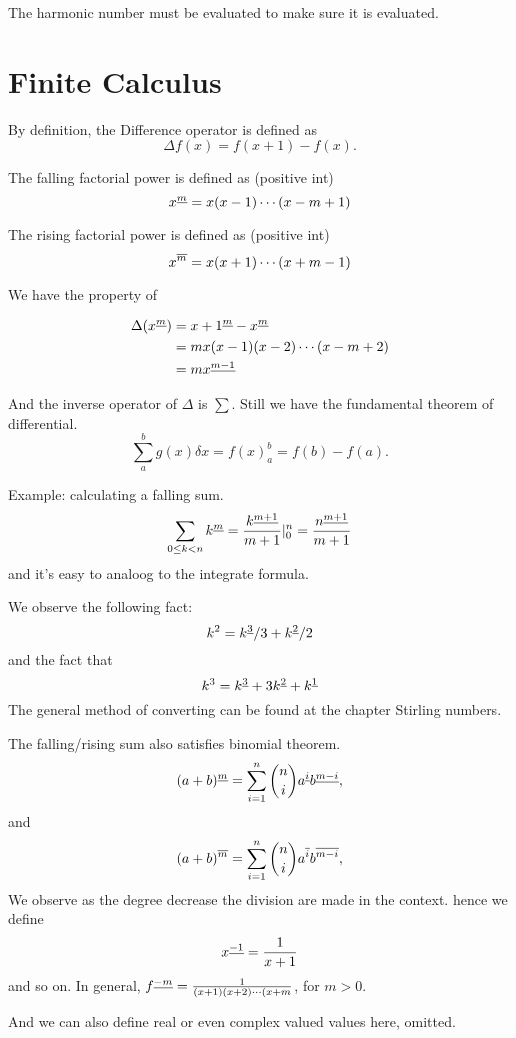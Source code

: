 The harmonic number must be evaluated to make sure it is evaluated. 

\section{Finite Calculus}

 By definition, the Difference operator is defined as 
    \[
        \Delta f(x)=f(x+1)-f(x).
    \]


The falling factorial power is defined as (positive int)
\[
    x^{\underline{m}} = x(x-1)\cdots (x-m+1)
\]

The rising factorial power is defined as (positive int) 
\[
    x^{\overline{m}}=x(x+1)\cdots (x+m-1)
\]

We have the property of 

\begin{align*}
    \Delta(x^{\underline{m}}) &= x+1^{\underline{m}} - x^{\underline{m}} \\
                      &= mx(x-1)(x-2)\cdots(x-m+2)\\
                      &= mx^{\underline{m-1}}
\end{align*}

And the inverse operator of $\Delta$ is $\sum$. 
Still we have the fundamental theorem of differential. 
\[
    \sum_{a}^{b}g(x)\delta x = f(x)_{a}^b = f(b)-f(a).
\]

Example: calculating a falling sum. 
\[
    \sum_{0\leq k< n}^{}k^{\underline{m}} = \frac{k^{\underline{m+1}}}{m+1} |_0^n = 
    \frac{n^{\underline{m+1}}}{m+1} 
\]
and it's easy to analoog to the integrate formula. 

 We observe the following fact: 
\[
    k^2=k^{\underline{3}}/3 + k^{\underline{2}}/2
\]
and the fact that 
\[
    k^3=k^{\underline{3}}+3k^{\underline{2}}+k^{\underline{1}}
\]
The general method of converting can be found at the chapter 
Stirling numbers. 

The falling/rising sum also satisfies binomial theorem. 
\[
    (a+b)^{\underline{m}} =\sum_{i=1}^{n}{n\choose i} a^{\underline{i}} b^{\underline{m-i}},
\]
and 
\[ 
    (a+b)^{\overline{m}} =\sum_{i=1}^{n}{n\choose i} a^{\overline{i}} b^{\overline{m-i}},
\]
 We observe as the degree decrease
 the division are made in the context. 
 hence we define 
\[
    x^{\underline{-1}}=\frac{1}{x+1}
\]
and so on. In general, $f^{\underline{-m}}=\frac{1}{(x+1)(x+2)\cdots(x+m}$, for $m>0.$

And we can also define real or even complex valued values here, omitted. 

